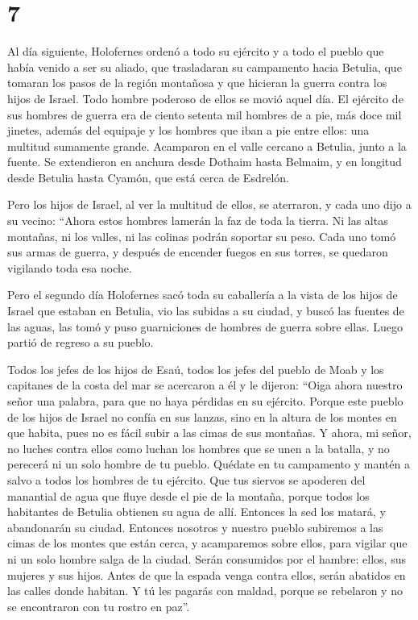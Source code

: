 \hypertarget{section-6}{%
\section{7}\label{section-6}}

 Al día siguiente, Holofernes ordenó a todo su ejército y
a todo el pueblo que había venido a ser su aliado, que trasladaran su
campamento hacia Betulia, que tomaran los pasos de la región montañosa y
que hicieran la guerra contra los hijos de Israel.  Todo
hombre poderoso de ellos se movió aquel día. El ejército de sus hombres
de guerra era de ciento setenta mil hombres de a pie, más doce mil
jinetes, además del equipaje y los hombres que iban a pie entre ellos:
una multitud sumamente grande.  Acamparon en el valle
cercano a Betulia, junto a la fuente. Se extendieron en anchura desde
Dothaim hasta Belmaim, y en longitud desde Betulia hasta Cyamón, que
está cerca de Esdrelón.

 Pero los hijos de Israel, al ver la multitud de ellos, se
aterraron, y cada uno dijo a su vecino: ``Ahora estos hombres lamerán la
faz de toda la tierra. Ni las altas montañas, ni los valles, ni las
colinas podrán soportar su peso.  Cada uno tomó sus armas
de guerra, y después de encender fuegos en sus torres, se quedaron
vigilando toda esa noche.

 Pero el segundo día Holofernes sacó toda su caballería a
la vista de los hijos de Israel que estaban en Betulia, 
vio las subidas a su ciudad, y buscó las fuentes de las aguas, las tomó
y puso guarniciones de hombres de guerra sobre ellas. Luego partió de
regreso a su pueblo.

 Todos los jefes de los hijos de Esaú, todos los jefes del
pueblo de Moab y los capitanes de la costa del mar se acercaron a él y
le dijeron:  ``Oiga ahora nuestro señor una palabra, para
que no haya pérdidas en su ejército.  Porque este pueblo
de los hijos de Israel no confía en sus lanzas, sino en la altura de los
montes en que habita, pues no es fácil subir a las cimas de sus
montañas.  Y ahora, mi señor, no luches contra ellos como
luchan los hombres que se unen a la batalla, y no perecerá ni un solo
hombre de tu pueblo.  Quédate en tu campamento y mantén a
salvo a todos los hombres de tu ejército. Que tus siervos se apoderen
del manantial de agua que fluye desde el pie de la montaña,
 porque todos los habitantes de Betulia obtienen su agua
de allí. Entonces la sed los matará, y abandonarán su ciudad. Entonces
nosotros y nuestro pueblo subiremos a las cimas de los montes que están
cerca, y acamparemos sobre ellos, para vigilar que ni un solo hombre
salga de la ciudad.  Serán consumidos por el hambre:
ellos, sus mujeres y sus hijos. Antes de que la espada venga contra
ellos, serán abatidos en las calles donde habitan.  Y tú
les pagarás con maldad, porque se rebelaron y no se encontraron con tu
rostro en paz''.

